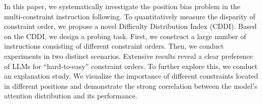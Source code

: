 In this paper, we systematically investigate the position bias problem in the multi-constraint instruction following. To quantitatively measure the disparity of constraint order, we propose a novel Difficulty Distribution Index (CDDI). Based on the CDDI, we design a probing task. First, we construct a large number of instructions consisting of different constraint orders. Then, we conduct experiments in two distinct scenarios. Extensive results reveal a clear preference of LLMs for ``hard-to-easy'' constraint orders. To further explore this, we conduct an explanation study. We visualize the importance of different constraints located in different positions and demonstrate the strong correlation between the model's attention distribution and its performance.